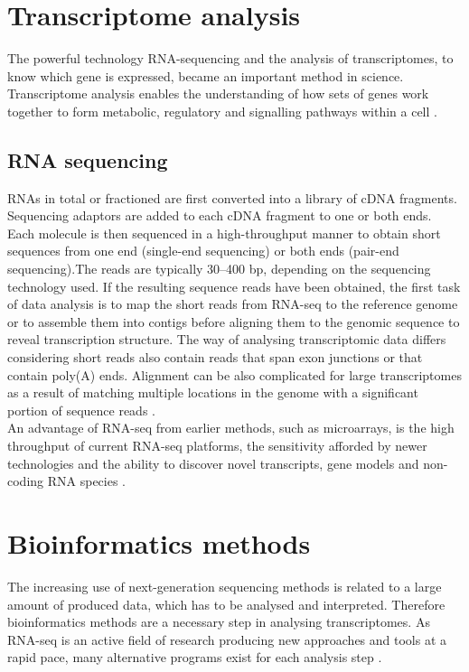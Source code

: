 \documentclass[12pt, a4paper]{report}
\begin{document}
\section{Transcriptome analysis}
The powerful technology RNA-sequencing and the analysis of transcriptomes, to know which gene is expressed, became an important method in science. Transcriptome analysis enables the understanding of how sets of genes work together to form metabolic, regulatory and signalling pathways within a cell \cite{Xiong2006}.  

\subsection{RNA sequencing}
RNAs in total or fractioned are first converted into a library of cDNA fragments. Sequencing adaptors are added to each cDNA fragment to one or both ends. Each molecule is then sequenced in a high-throughput manner to obtain short sequences from one end (single-end sequencing) or both ends (pair-end sequencing).The reads are typically 30–400 bp, depending on the sequencing technology used. If the resulting sequence reads have been obtained, the first task of data analysis is to map the short reads from RNA-seq to the reference genome or to assemble them into contigs before aligning them to the genomic sequence to reveal transcription structure. The way of analysing transcriptomic data differs considering short reads also contain reads that span exon junctions or that contain poly(A) ends. Alignment can be also complicated for large transcriptomes as a result of matching multiple locations in the genome with a significant portion of sequence reads \cite{Wang2010}.  \\
An advantage of RNA-seq from earlier methods, such as microarrays, is the high throughput of current RNA-seq platforms, the sensitivity afforded by newer technologies and the ability to discover novel transcripts, gene models and non-coding RNA species \cite{Korpelainen2014}.  \\

\section{Bioinformatics methods}
The increasing use of next-generation sequencing methods is related to a large amount of produced data, which has to be analysed and interpreted. Therefore bioinformatics methods are a necessary step in analysing transcriptomes. As RNA-seq is an active field of research producing new approaches and tools at a rapid pace, many alternative programs exist for each analysis step \cite{Korpelainen2014}. 
\end{document}
